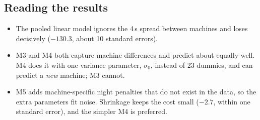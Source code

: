 \documentclass{article}
\begin{document}
\subsection*{Reading the results}
\begin{itemize}
  \item The pooled linear model ignores the 4\,s spread between machines and
        loses decisively ($-130.3$, about 10 standard errors).
  \item M3 and M4 both capture machine differences and predict about equally
        well. M4 does it with one variance parameter, $\sigma_0$, instead of
        23 dummies, and can predict a \emph{new} machine; M3 cannot.
  \item M5 adds machine-specific night penalties that do not exist in the
        data, so the extra parameters fit noise. Shrinkage keeps the cost
        small ($-2.7$, within one standard error), and the simpler M4 is
        preferred.
\end{itemize}
\end{document}
